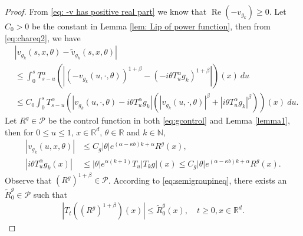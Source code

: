 \documentclass[12pt, a4paper]{amsart}
\theoremstyle{definition}
\numberwithin{equation}{section}
\begin{document}
\begin{proof}
From \eqref{eq: -v has positive real part} we know that $\operatorname{Re}(-v_{g_k})\geq 0$.
    Let $C_0>0$ be the constant in Lemma \ref{lem: Lip of power function}, then from \eqref{eq:chareq2}, we have
\begin{align}
\label{eq: estimate of wgk}
   &|v_{g_k}(s,x,\theta)-\tilde{v}_{g_k}(s,x,\theta)|
   \\&\leq \int_0^s T_{s-u}^{\alpha}\left(|(-v_{g_k}(u,\cdot,\theta))^{1+\beta}-(-i\theta T_u^{\alpha}g_k)^{1+\beta}|\right)(x)~du
   \\&\leq C_0\int_0^s T_{s-u}^{\alpha}\left( |v_{g_k}(u,\cdot,\theta)-i\theta T_u^{\alpha}g_{k}|\left(|v_{g_k}(u,\cdot,\theta)|^{\beta}+|i\theta T_u^{\alpha}g_k|^{\beta}\right)\right)(x)~du.
\end{align}
   Let $R^g\in \mathcal P$ be the control function in both \eqref{eq:gcontrol} and Lemma \ref{lemma1}, then for $0\leq u \leq 1$, $x\in \mathbb{R}^d$, $\theta \in \mathbb{R}$ and $k \in \mathbb N$,
\begin{align}
\label{eq: upper bound of wgk}
    |v_{g_{k}}(u,x,\theta)|
    &\leq C_g|\theta|e^{(\alpha-\kappa b)k+\alpha}R^g(x),
    \\
    |i\theta T_u^{\alpha}g_k(x)|
    &\leq |\theta| e^{\alpha(k+1)}T_u|T_k g|(x)
    \leq C_g|\theta|e^{(\alpha-\kappa b)k+\alpha}R^g(x).
\end{align}
    Observe that $(R^g)^{1+\beta}\in \mathcal P$.
    According to \eqref{eq:semigroupineq}, there exists an $\tilde R^g_0 \in \mathcal P$ such that
\begin{align}
\label{eq: tilde R0}
    |T_t ((R^g)^{1+\beta})(x)|
    \leq \tilde R^g_0(x),
    \quad t\geq0, x\in \mathbb{R}^d.

\end{align}
\end{proof}
\end{document}
